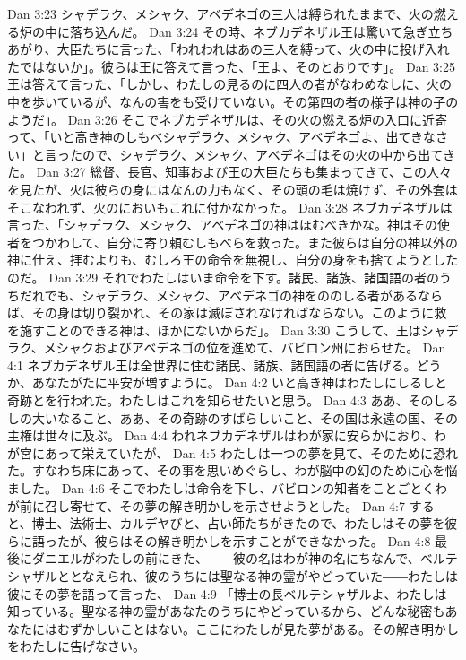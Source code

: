 Dan 3:23  シャデラク、メシャク、アベデネゴの三人は縛られたままで、火の燃える炉の中に落ち込んだ。
Dan 3:24  その時、ネブカデネザル王は驚いて急ぎ立ちあがり、大臣たちに言った、「われわれはあの三人を縛って、火の中に投げ入れたではないか」。彼らは王に答えて言った、「王よ、そのとおりです」。
Dan 3:25  王は答えて言った、「しかし、わたしの見るのに四人の者がなわめなしに、火の中を歩いているが、なんの害をも受けていない。その第四の者の様子は神の子のようだ」。
Dan 3:26  そこでネブカデネザルは、その火の燃える炉の入口に近寄って、「いと高き神のしもべシャデラク、メシャク、アベデネゴよ、出てきなさい」と言ったので、シャデラク、メシャク、アベデネゴはその火の中から出てきた。
Dan 3:27  総督、長官、知事および王の大臣たちも集まってきて、この人々を見たが、火は彼らの身にはなんの力もなく、その頭の毛は焼けず、その外套はそこなわれず、火のにおいもこれに付かなかった。
Dan 3:28  ネブカデネザルは言った、「シャデラク、メシャク、アベデネゴの神はほむべきかな。神はその使者をつかわして、自分に寄り頼むしもべらを救った。また彼らは自分の神以外の神に仕え、拝むよりも、むしろ王の命令を無視し、自分の身をも捨てようとしたのだ。
Dan 3:29  それでわたしはいま命令を下す。諸民、諸族、諸国語の者のうちだれでも、シャデラク、メシャク、アベデネゴの神をののしる者があるならば、その身は切り裂かれ、その家は滅ぼされなければならない。このように救を施すことのできる神は、ほかにないからだ」。
Dan 3:30  こうして、王はシャデラク、メシャクおよびアベデネゴの位を進めて、バビロン州におらせた。
Dan 4:1  ネブカデネザル王は全世界に住む諸民、諸族、諸国語の者に告げる。どうか、あなたがたに平安が増すように。
Dan 4:2  いと高き神はわたしにしるしと奇跡とを行われた。わたしはこれを知らせたいと思う。
Dan 4:3  ああ、そのしるしの大いなること、ああ、その奇跡のすばらしいこと、その国は永遠の国、その主権は世々に及ぶ。
Dan 4:4  われネブカデネザルはわが家に安らかにおり、わが宮にあって栄えていたが、
Dan 4:5  わたしは一つの夢を見て、そのために恐れた。すなわち床にあって、その事を思いめぐらし、わが脳中の幻のために心を悩ました。
Dan 4:6  そこでわたしは命令を下し、バビロンの知者をことごとくわが前に召し寄せて、その夢の解き明かしを示させようとした。
Dan 4:7  すると、博士、法術士、カルデヤびと、占い師たちがきたので、わたしはその夢を彼らに語ったが、彼らはその解き明かしを示すことができなかった。
Dan 4:8  最後にダニエルがわたしの前にきた、――彼の名はわが神の名にちなんで、ベルテシャザルととなえられ、彼のうちには聖なる神の霊がやどっていた――わたしは彼にその夢を語って言った、
Dan 4:9  「博士の長ベルテシャザルよ、わたしは知っている。聖なる神の霊があなたのうちにやどっているから、どんな秘密もあなたにはむずかしいことはない。ここにわたしが見た夢がある。その解き明かしをわたしに告げなさい。
